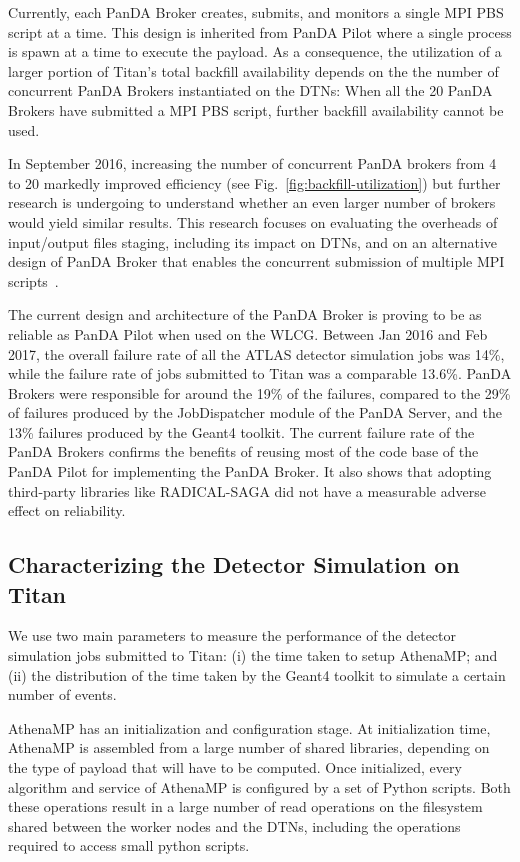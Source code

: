 \documentclass[conference]{IEEEtran}
\begin{document}
Currently, each PanDA Broker creates, submits, and monitors a single MPI PBS
script at a time. This design is inherited from PanDA Pilot where a single
process is spawn at a time to execute the payload. As a consequence, the
utilization of a larger portion of Titan's total backfill availability depends
on the the number of concurrent PanDA Brokers instantiated on the DTNs: When all
the 20 PanDA Brokers have submitted a MPI PBS script, further backfill
availability cannot be used.

In September 2016, increasing the number of concurrent PanDA brokers from 4 to
20 markedly improved efficiency (see Fig.~\ref{fig:backfill-utilization}) but
further research is undergoing to understand whether an even larger number of
brokers would yield similar results. This research focuses on evaluating the
overheads of input/output files staging, including its impact on DTNs, and on an
alternative design of PanDA Broker that enables the concurrent submission of
multiple MPI scripts~\cite{barreiro2016panda}.

The current design and architecture of the PanDA Broker is proving to be as
reliable as PanDA Pilot when used on the WLCG. Between Jan 2016 and Feb 2017,
the overall failure rate of all the ATLAS detector simulation jobs was 14\%,
while the failure rate of jobs submitted to Titan was a comparable 13.6\%. PanDA
Brokers were responsible for around the 19\% of the failures, compared to the
29\% of failures produced by the JobDispatcher module of the PanDA Server, and
the 13\% failures produced by the Geant4 toolkit. The current failure rate of
the PanDA Brokers confirms the benefits of reusing most of the code base of the
PanDA Pilot for implementing the PanDA Broker. It also shows that adopting
third-party libraries like RADICAL-SAGA did not have a measurable adverse effect
on reliability.


\subsection{Characterizing the Detector Simulation on Titan}
\label{ssec:athenamp_titan}

We use two main parameters to measure the performance of the detector simulation
jobs submitted to Titan: (i) the time taken to setup AthenaMP; and (ii) the
distribution of the time taken by the Geant4 toolkit to simulate a certain
number of events.

AthenaMP has an initialization and configuration stage. At initialization time,
AthenaMP is assembled from a large number of shared libraries, depending on the
type of payload that will have to be computed. Once initialized, every algorithm
and service of AthenaMP is configured by a set of Python scripts. Both these
operations result in a large number of read operations on the filesystem shared
between the worker nodes and the DTNs, including the operations required to
access small python scripts.
\end{document}
